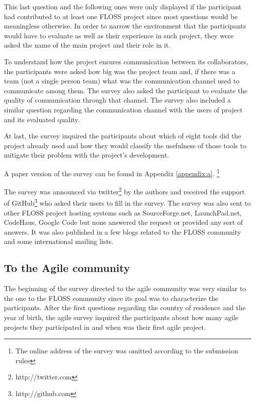 \documentclass[lnbip]{svmultln}
\newcommand{\footnoteremember}[2]{
  \footnote{#2}
  \newcounter{#1}
  \setcounter{#1}{\value{footnote}}
}
\begin{document}
This last question and the following ones were only displayed if the
participant had contributed to at least one FLOSS project since most
questions would be meaningless otherwise. In order to narrow the
environment that the participants would have to evaluate as well as
their experience in such project, they were asked the name of the main
project and their role in it.

To understand how the project ensures communication between its
collaborators, the participants were asked how big was the project
team and, if there was a team (not a single person team) what was the
communication channel used to communicate among them. The survey also
asked the participant to evaluate the quality of communication through
that channel. The survey also included a similar question regarding
the communication channel with the users of project and its evaluated
quality.

At last, the survey inquired the participants about which of eight
tools did the project already used and how they would classify the
usefulness of those tools to mitigate their problem with the project's
development.

A paper version of the survey can be found in Appendix
\ref{appendix:a}.\footnoteremember{onlineoff}{The online address of
  the survey was omitted according to the submission rules}

The survey was announced via twitter\footnote{http://twitter.com} by
the authors and received the support of
GitHub\footnote{http://github.com} who asked their users to fill in
the survey.  The survey was also sent to other FLOSS project hosting
systems such as SourceForge.net, LaunchPad.net, CodeHaus, Google Code
but none answered the request or provided any sort of answers. It was
also published in a few blogs related to the FLOSS community and some
international mailing lists.

\subsection{To the Agile community}
\label{subsec:agile-survey}

The beginning of the survey directed to the agile community was very
similar to the one to the FLOSS community since its goal was to
characterize the participants.  After the first questions regarding
the country of residence and the year of birth, the agile survey
inquired the participants about how many agile projects they
participated in and when was their first agile project.
\end{document}

